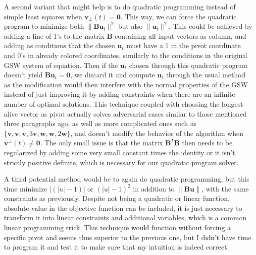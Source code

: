 \documentclass[12pt]{article}
\begin{document}

A second variant that might help is to do quadratic programming instead of simple least squares when $\textbf{v}_\perp(t)=\textbf{0}$. This way, we can force the quadratic program to minimize both $\|\textbf{Bu}_t\|^2$ but also $\|\textbf{u}_t\|^2$. This could be achieved by adding a line of 1's to the matrix $\textbf{B}$ containing all input vectors as column, and adding as conditions that the chosen $\textbf{u}_t$ must have a 1 in the pivot coordinate and 0's in already colored coordinates, similarly to the conditions in the original GSW system of equation. Then if the $\textbf{u}_t$ chosen through this quadratic program doesn't yield $\textbf{Bu}_t=\textbf{0}$, we discard it and compute $\textbf{u}_t$ through the usual method as the modification would then interfere with the normal properties of the GSW instead of just improving it by adding constraints when there are an infinite number of optimal solutions. This technique coupled with choosing the longest alive vector as pivot actually solves adversarial cases similar to those mentioned three paragraphs ago, as well as more complicated ones such as $\{\textbf{v},\textbf{v},\textbf{v},3\textbf{v},\textbf{w},\textbf{w},2\textbf{w}\}$, and doesn't modify the behavior of the algorithm when $\textbf{v}^\perp(t)\not=\textbf{0}$. The only small issue is that the matrix $\textbf{B}^T\textbf{B}$ then needs to be regularized by adding some very small constant times the identity or it isn't strictly positive definite, which is necessary for our quadratic program solver.

A third potential method would be to again do quadratic programming, but this time minimize $|(|u|-1)|$ or $(|u|-1)^2$ in addition to $\|\textbf{Bu}\|$, with the same constraints as previously. Despite not being a quadratic or linear function, absolute value in the objective function can be included, it is just necessary to transform it into linear constraints and additional variables, which is a common linear programming trick. This technique would function without forcing a specific pivot and seems thus superior to the previous one, but I didn't have time to program it and test it to make sure that my intuition is indeed correct.
\end{document}
